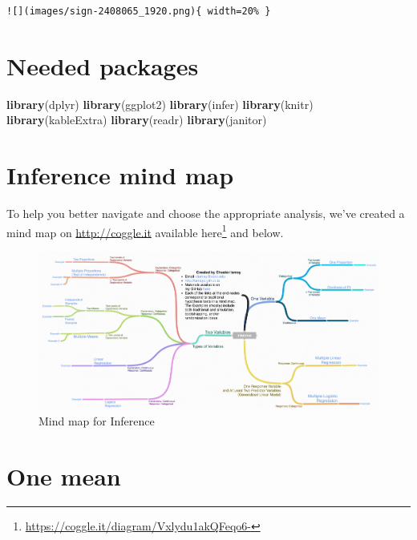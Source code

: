 \documentclass[12pt,]{krantz}
\makeatletter
\newenvironment{Shaded}{\begin{snugshade}}{\end{snugshade}}
\newcommand{\KeywordTok}[1]{\textcolor[rgb]{0.27,0.27,0.27}{\textbf{#1}}}
\newcommand{\NormalTok}[1]{#1}
\renewcommand{\href}[2]{#2\footnote{\url{#1}}}
\newenvironment{kframe}{%
\medskip{}
\setlength{\fboxsep}{.8em}
 \def\at@end@of@kframe{}%
 \ifinner\ifhmode%
  \def\at@end@of@kframe{\end{minipage}}%
  \begin{minipage}{\columnwidth}%
 \fi\fi%
 \def\FrameCommand##1{\hskip\@totalleftmargin \hskip-\fboxsep
 \colorbox{shadecolor}{##1}\hskip-\fboxsep
     \hskip-\linewidth \hskip-\@totalleftmargin \hskip\columnwidth}%
 \MakeFramed {\advance\hsize-\width
   \@totalleftmargin\z@ \linewidth\hsize
   \@setminipage}}%
 {\par\unskip\endMakeFramed%
 \at@end@of@kframe}
\renewenvironment{Shaded}{\begin{kframe}}{\end{kframe}}
\theoremstyle{definition}
\theoremstyle{definition}
\theoremstyle{definition}
\theoremstyle{remark}
\makeatother
\begin{document}
\begin{verbatim}
![](images/sign-2408065_1920.png){ width=20% }
\end{verbatim}

\section*{Needed packages}\label{needed-packages-10}


\begin{Shaded}
\begin{Highlighting}[]
\KeywordTok{library}\NormalTok{(dplyr)}
\KeywordTok{library}\NormalTok{(ggplot2)}
\KeywordTok{library}\NormalTok{(infer)}
\KeywordTok{library}\NormalTok{(knitr)}
\KeywordTok{library}\NormalTok{(kableExtra)}
\KeywordTok{library}\NormalTok{(readr)}
\KeywordTok{library}\NormalTok{(janitor)}
\end{Highlighting}
\end{Shaded}

\section{Inference mind map}\label{inference-mind-map}

To help you better navigate and choose the appropriate analysis, we've
created a mind map on \url{http://coggle.it} available
\href{https://coggle.it/diagram/Vxlydu1akQFeqo6-}{here} and below.

\begin{figure}

{\centering \includegraphics[width=2\linewidth]{images/coggle} 

}

\caption{Mind map for Inference}\label{fig:infer-map}
\end{figure}

\section{One mean}\label{one-mean}
\end{document}
